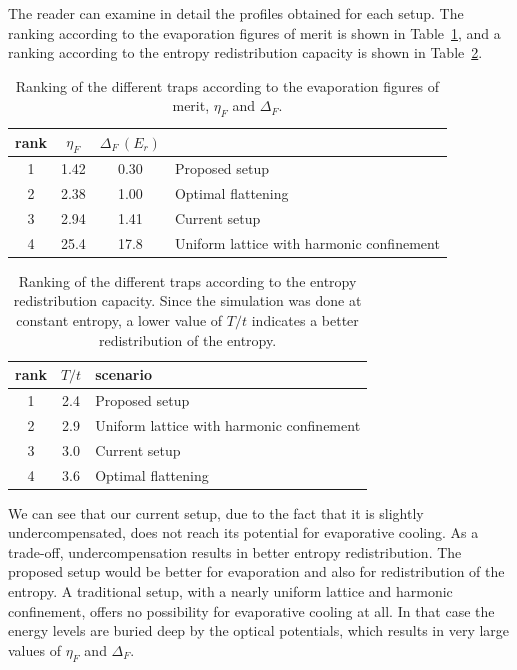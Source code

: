 The reader can examine in detail the profiles obtained for each setup.  The
ranking according to the evaporation figures of merit is shown in
Table~\ref{tab:evap}, and a ranking according to the entropy
redistribution capacity is shown in Table~\ref{tab:entropy}. 

\begin{table}   
\begin{center}
\begin{tabular}{ |c|c|c|l|}
   \hline
   rank & $\eta_{F}$ & $\Delta_{F}\,(E_{r})$&   \\
   \hline
    1   &  1.42  & 0.30  &  Proposed setup \\ 
    2   &  2.38  & 1.00  &  Optimal flattening \\ 
    3   &  2.94  & 1.41  &  Current setup  \\ 
    4   &  25.4  & 17.8  &  Uniform lattice with harmonic confinement \\
   \hline
\end{tabular}
\end{center}
\caption{Ranking of the different traps according to the evaporation figures of
merit,  $\eta_{F}$ and $\Delta_{F}$.  }
\label{tab:evap} 
\end{table}
\begin{table}  
\begin{center}
\begin{tabular}{ |c|c|l|}
   \hline
   rank & $T/t$ &  scenario  \\
   \hline
    1   &  2.4  &  Proposed setup \\ 
    2   &  2.9  &  Uniform lattice with harmonic confinement \\
    3   &  3.0  &  Current setup  \\ 
    4   &  3.6  &  Optimal flattening \\ 
   \hline
\end{tabular}
\end{center}
\caption{Ranking of the different traps according to the entropy redistribution
capacity.  Since the simulation was done at constant entropy, a lower value of
$T/t$ indicates a better redistribution of the entropy.  }
\label{tab:entropy}
\end{table} 

We can see that our current setup, due to the fact that it is slightly
undercompensated, does not reach its potential for evaporative cooling.   As a
trade-off, undercompensation results in better entropy redistribution.   The
proposed setup would be better for evaporation and also for redistribution of
the entropy.   A traditional setup, with a nearly uniform lattice and harmonic
confinement, offers no possibility for evaporative cooling at all.  In that
case the energy levels are buried deep by the optical potentials, which results
in very large values of $\eta_{F}$ and $\Delta_{F}$. 

